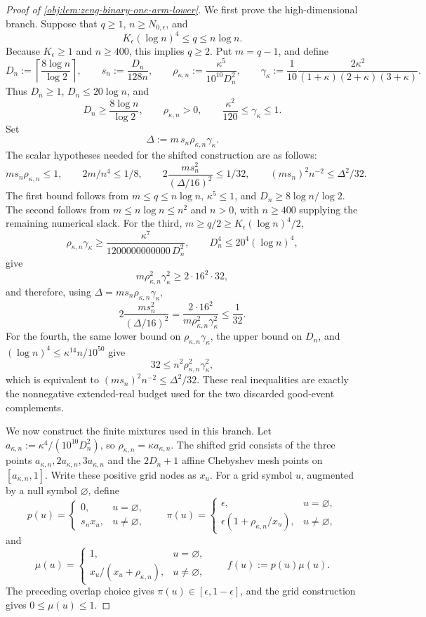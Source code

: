 \begin{proof}[Proof of \cref{obj:lem:zeng-binary-one-arm-lower}]
We first prove the high-dimensional branch.  Suppose that \(q\ge1\), \(n\ge N_{0,\epsilon}\), and
\[
K_\epsilon(\log n)^4\le q\le n\log n .
\]
Because \(K_\epsilon\ge1\) and \(n\ge400\), this implies \(q\ge2\).  Put \(m=q-1\), and define
\[
D_n:=\left\lceil \frac{8\log n}{\log 2}\right\rceil,
\qquad
s_n:=\frac{D_n}{128n},
\qquad
\rho_{\kappa,n}:=\frac{\kappa^5}{10^{10}D_n^2},
\qquad
\gamma_\kappa:=\frac{1}{10}\frac{2\kappa^2}{(1+\kappa)(2+\kappa)(3+\kappa)}.
\]
Thus \(D_n\ge1\), \(D_n\le20\log n\), and
\[
D_n\ge \frac{8\log n}{\log 2},
\qquad
\rho_{\kappa,n}>0,
\qquad
\frac{\kappa^2}{120}\le\gamma_\kappa\le1.
\]
Set
\[
\Delta:=m\,s_n\rho_{\kappa,n}\gamma_\kappa .
\]
The scalar hypotheses needed for the shifted construction are as follows:
\[
m s_n\rho_{\kappa,n}\le 1,
\qquad
2m/n^4\le 1/8,
\qquad
2\frac{m s_n^2}{(\Delta/16)^2}\le 1/32,
\qquad
(m s_n)^2 n^{-2}\le \Delta^2/32 .
\]
The first bound follows from \(m\le q\le n\log n\), \(\kappa^5\le1\), and \(D_n\ge8\log n/\log2\).  The second follows from \(m\le n\log n\le n^2\) and \(n>0\), with \(n\ge400\) supplying the remaining numerical slack.  For the third, \(m\ge q/2\ge K_\epsilon(\log n)^4/2\),
\[
\rho_{\kappa,n}\gamma_\kappa
\ge
\frac{\kappa^7}{1200000000000\,D_n^2},
\qquad
D_n^4\le 20^4(\log n)^4,
\]
give
\[
m\rho_{\kappa,n}^2\gamma_\kappa^2
\ge 2\cdot 16^2\cdot 32,
\]
and therefore, using \(\Delta=m s_n\rho_{\kappa,n}\gamma_\kappa\),
\[
2\frac{m s_n^2}{(\Delta/16)^2}
=
\frac{2\cdot16^2}{m\rho_{\kappa,n}^2\gamma_\kappa^2}
\le \frac1{32}.
\]
For the fourth, the same lower bound on \(\rho_{\kappa,n}\gamma_\kappa\), the upper bound on \(D_n\), and \((\log n)^4\le \kappa^{14}n/10^{50}\) give
\[
32\le n^2\rho_{\kappa,n}^2\gamma_\kappa^2,
\]
which is equivalent to \((m s_n)^2 n^{-2}\le\Delta^2/32\).  These real inequalities are exactly the nonnegative extended-real budget used for the two discarded good-event complements.

We now construct the finite mixtures used in this branch.  Let \(a_{\kappa,n}:=\kappa^4/(10^{10}D_n^2)\), so \(\rho_{\kappa,n}=\kappa a_{\kappa,n}\).  The shifted grid consists of the three points \(a_{\kappa,n},2a_{\kappa,n},3a_{\kappa,n}\) and the \(2D_n+1\) affine Chebyshev mesh points on \([a_{\kappa,n},1]\).  Write these positive grid nodes as \(x_u\).  For a grid symbol \(u\), augmented by a null symbol \(\varnothing\), define
\[
p(u)=
\begin{cases}
0,&u=\varnothing,\\
s_n x_u,&u\ne\varnothing,
\end{cases}
\qquad
\pi(u)=
\begin{cases}
\epsilon,&u=\varnothing,\\
\epsilon\left(1+\rho_{\kappa,n}/x_u\right),&u\ne\varnothing,
\end{cases}
\]
and
\[
\mu(u)=
\begin{cases}
1,&u=\varnothing,\\
x_u/(x_u+\rho_{\kappa,n}),&u\ne\varnothing,
\end{cases}
\qquad
f(u):=p(u)\mu(u).
\]
The preceding overlap choice gives \(\pi(u)\in[\epsilon,1-\epsilon]\), and the grid construction gives \(0\le\mu(u)\le1\).


\end{proof}
